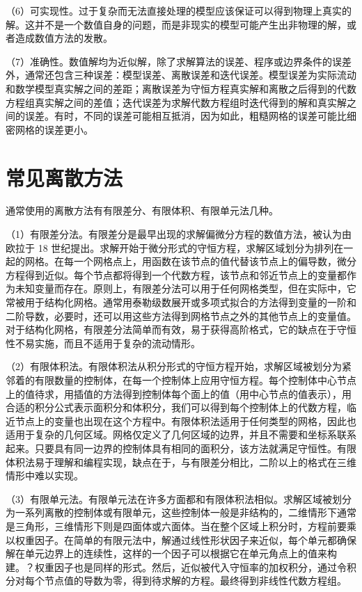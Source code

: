 （6）可实现性。过于复杂而无法直接处理的模型应该保证可以得到物理上真实的解。这并不是一个数值自身的问题，而是非现实的模型可能产生出非物理的解，或者造成数值方法的发散。

（7）准确性。数值解均为近似解，除了求解算法的误差、程序或边界条件的误差外，通常还包含三种误差：模型误差、离散误差和迭代误差。模型误差为实际流动和数学模型真实解之间的差距；离散误差为守恒方程真实解和离散之后得到的代数方程组真实解之间的差值；迭代误差为求解代数方程组时迭代得到的解和真实解之间的误差。有时，不同的误差可能相互抵消，因为如此，粗糙网格的误差可能比细密网格的误差更小。

\section{常见离散方法}

通常使用的离散方法有有限差分、有限体积、有限单元法几种。

（1）有限差分法。有限差分是最早出现的求解偏微分方程的数值方法，被认为由欧拉于 18 世纪提出。求解开始于微分形式的守恒方程，求解区域划分为排列在一起的网格。在每一个网格点上，用函数在该节点的值代替该节点上的偏导数，微分方程得到近似。每个节点都将得到一个代数方程，该节点和邻近节点上的变量都作为未知变量而存在。原则上，有限差分法可以用于任何网格类型，但在实际中，它常被用于结构化网格。通常用泰勒级数展开或多项式拟合的方法得到变量的一阶和二阶导数，必要时，还可以用这些方法得到网格节点之外的其他节点上的变量值。对于结构化网格，有限差分法简单而有效，易于获得高阶格式，它的缺点在于守恒性不易实施，而且不适用于复杂的流动情形。

（2）有限体积法。有限体积法从积分形式的守恒方程开始，求解区域被划分为紧邻着的有限数量的控制体，在每一个控制体上应用守恒方程。每个控制体中心节点上的值待求，用插值的方法得到控制体每个面上的值（用中心节点的值表示），用合适的积分公式表示面积分和体积分，我们可以得到每个控制体上的代数方程，临近节点上的变量也出现在这个方程中。有限体积法适用于任何类型的网格，因此也适用于复杂的几何区域。网格仅定义了几何区域的边界，并且不需要和坐标系联系起来。只要具有同一边界的控制体具有相同的面积分，该方法就满足守恒性。有限体积法易于理解和编程实现，缺点在于，与有限差分相比，二阶以上的格式在三维情形中难以实现。

（3）有限单元法。有限单元法在许多方面都和有限体积法相似。求解区域被划分为一系列离散的控制体或有限单元，这些控制体一般是非结构的，二维情形下通常是三角形，三维情形下则是四面体或六面体。当在整个区域上积分时，方程前要乘以权重因子。在简单的有限元法中，解通过线性形状因子来近似，每个单元都确保解在单元边界上的连续性，这样的一个因子可以根据它在单元角点上的值来构建。？权重因子也是同样的形式。然后，近似被代入守恒率的加权积分，通过令积分对每个节点值的导数为零，得到待求解的方程。最终得到非线性代数方程组。

